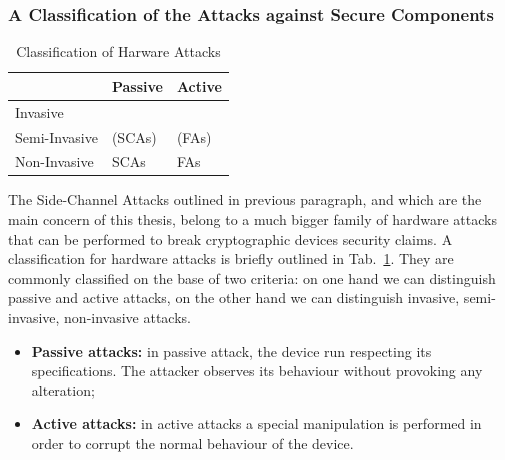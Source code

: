 \subsubsection{A Classification of the Attacks against Secure Components}\label{sec:classification_attacks}
\begin{table}[]
\centering
\caption{Classification of Harware Attacks}
\label{fig:classification_attacks}
\begin{tabular}{l|l|l|}
\cline{2-3}
                                    & Passive & Active \\ \hline
\multicolumn{1}{|l|}{Invasive}      &         &        \\ \hline
\multicolumn{1}{|l|}{Semi-Invasive} & (SCAs)  & (FAs)  \\ \hline
\multicolumn{1}{|l|}{Non-Invasive}  & SCAs    & FAs    \\ \hline
\end{tabular}
\end{table}

The Side-Channel Attacks outlined in previous paragraph, and which are the main concern of this thesis,  belong to a much bigger family of hardware attacks that can be performed to break cryptographic devices security claims. A classification for hardware attacks is briefly outlined in Tab.~\ref{fig:classification_attacks}. They are commonly classified on the base of two criteria: on one hand we can distinguish passive and active attacks, on the other hand we can distinguish invasive, semi-invasive, non-invasive attacks. 
\begin{itemize}
\item[] \textbf{Passive attacks:} in passive attack, the device run respecting its specifications. The attacker observes its behaviour without provoking any alteration;
\item[] \textbf{Active attacks:}  in active attacks a special manipulation is performed in order to corrupt the normal behaviour of the device. 
\end{itemize}


